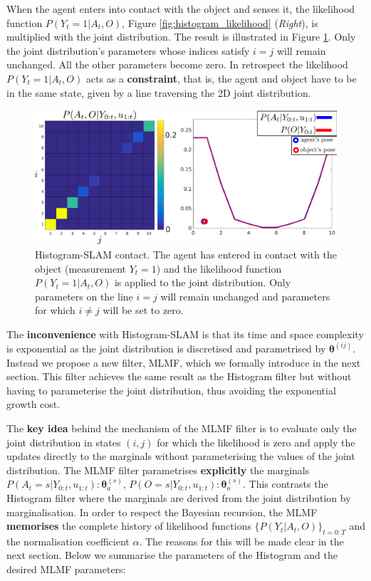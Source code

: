 When the agent enters into contact with the object and senses it, the likelihood function $P(Y_t=1|A_t,O)$, Figure \ref{fig:histogram_likelihood} (\textit{Right}), is 
multiplied with the joint distribution. The result is illustrated in Figure \ref{fig:discrete_example_contact}. Only the joint distribution's parameters whose indices
satisfy $i = j$ will remain unchanged. All the other parameters become zero. In retrospect the likelihood $P(Y_t=1|A_t,O)$ acts as a \textbf{constraint}, 
that is, the agent and object have to be in the same state, given by a line traversing the 2D joint distribution.

\begin{figure}
 \centering
 \includegraphics[width=\textwidth]{./ch5-MLMF/Figures/explenation/joint_marginal_contact.pdf}
 \caption{Histogram-SLAM contact. The agent has entered in contact with the object (measurement $Y_t = 1$) and the likelihood function $P(Y_t=1|A_t,O)$ is applied to the joint
 distribution. Only parameters on the line $i=j$ will remain unchanged and parameters for which $i \not= j$ will be set to zero.}
 \label{fig:discrete_example_contact}
\end{figure}

The \textbf{inconvenience} with Histogram-SLAM is that its time and space complexity is exponential as the joint distribution is discretised and 
parametrised by $\boldsymbol{\theta}^{(ij)}$. Instead we propose a new filter, MLMF, which we formally introduce in the next section. This filter
achieves the same result as the Histogram filter but without having to parameterise the joint distribution, thus avoiding the exponential growth cost. 

The \textbf{key idea} behind the mechanism of the MLMF filter is to evaluate only the joint distribution in states $(i,j)$ 
for which the likelihood is zero and apply the updates directly to the marginals without parameterising the values of the joint distribution.
The MLMF filter parametrises \textbf{explicitly} the marginals $P(A_t=s|Y_{0:t},u_{1:t}): \boldsymbol{\theta}_a^{(s)}$, $P(O=s|Y_{0:t},u_{1:t}): \boldsymbol{\theta}_o^{(s)}$. 
This contrasts the Histogram filter where the marginals are  
derived from the joint distribution by marginalisation. In order to respect the Bayesian recursion, the MLMF \textbf{memorises} the complete history of likelihood functions $\{P(Y_t|A_t,O)\}_{t=0:T}$ and the normalisation coefficient $\alpha$. 
The reasons for this will be made clear in the next section. Below we summarise the parameters of the Histogram and the 
desired MLMF parameters:

